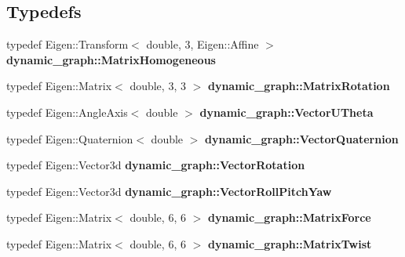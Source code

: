\subsection*{Typedefs}
\begin{DoxyCompactItemize}
\item 
typedef Eigen\+::\+Transform$<$ double, 3, Eigen\+::\+Affine $>$ {\bfseries dynamic\+\_\+graph\+::\+Matrix\+Homogeneous}\hypertarget{namespacedynamic__graph_a1cf832cafc093c1600db8cc4436661bb}{}\label{namespacedynamic__graph_a1cf832cafc093c1600db8cc4436661bb}

\item 
typedef Eigen\+::\+Matrix$<$ double, 3, 3 $>$ {\bfseries dynamic\+\_\+graph\+::\+Matrix\+Rotation}\hypertarget{namespacedynamic__graph_a50d1b342105103d3078687b78d5e8197}{}\label{namespacedynamic__graph_a50d1b342105103d3078687b78d5e8197}

\item 
typedef Eigen\+::\+Angle\+Axis$<$ double $>$ {\bfseries dynamic\+\_\+graph\+::\+Vector\+U\+Theta}\hypertarget{namespacedynamic__graph_aabaea0c174dde41c755e8d3fb6d23caa}{}\label{namespacedynamic__graph_aabaea0c174dde41c755e8d3fb6d23caa}

\item 
typedef Eigen\+::\+Quaternion$<$ double $>$ {\bfseries dynamic\+\_\+graph\+::\+Vector\+Quaternion}\hypertarget{namespacedynamic__graph_a9f22f1c9369a98e94778717faeec3f4b}{}\label{namespacedynamic__graph_a9f22f1c9369a98e94778717faeec3f4b}

\item 
typedef Eigen\+::\+Vector3d {\bfseries dynamic\+\_\+graph\+::\+Vector\+Rotation}\hypertarget{namespacedynamic__graph_afe3e8341b18b6a3b59f2fa579c2e12c1}{}\label{namespacedynamic__graph_afe3e8341b18b6a3b59f2fa579c2e12c1}

\item 
typedef Eigen\+::\+Vector3d {\bfseries dynamic\+\_\+graph\+::\+Vector\+Roll\+Pitch\+Yaw}\hypertarget{namespacedynamic__graph_af84ad658e1cf7d496958772210dd51b6}{}\label{namespacedynamic__graph_af84ad658e1cf7d496958772210dd51b6}

\item 
typedef Eigen\+::\+Matrix$<$ double, 6, 6 $>$ {\bfseries dynamic\+\_\+graph\+::\+Matrix\+Force}\hypertarget{namespacedynamic__graph_a43b4e15f6e943f7208372fd22ea108eb}{}\label{namespacedynamic__graph_a43b4e15f6e943f7208372fd22ea108eb}

\item 
typedef Eigen\+::\+Matrix$<$ double, 6, 6 $>$ {\bfseries dynamic\+\_\+graph\+::\+Matrix\+Twist}\hypertarget{namespacedynamic__graph_a933ba3678a5e0b14430acd27709cdf47}{}\label{namespacedynamic__graph_a933ba3678a5e0b14430acd27709cdf47}

\end{DoxyCompactItemize}
